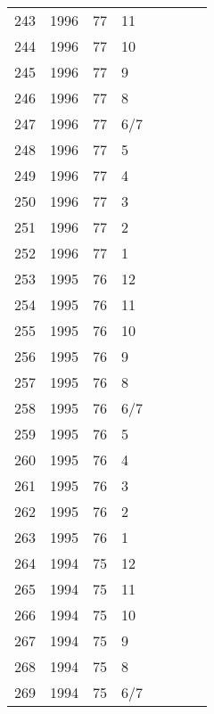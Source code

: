 \begin{longtable}{ |l|l|l|l|l|l|l|l| }
243 & 1996 & 77 &    11 &         &                &  & \\
244 & 1996 & 77 &    10 &         &                &  & \\
245 & 1996 & 77 &     9 &         &                &  & \\
246 & 1996 & 77 &     8 &         &                &  & \\
247 & 1996 & 77 &   6/7 &         &                &  & \\
248 & 1996 & 77 &     5 &         &                &  & \\
249 & 1996 & 77 &     4 &         &                &  & \\
250 & 1996 & 77 &     3 &         &                &  & \\
251 & 1996 & 77 &     2 &         &                &  & \\
252 & 1996 & 77 &     1 &         &                &  & \\
253 & 1995 & 76 &    12 &         &                &  & \\
254 & 1995 & 76 &    11 &         &                &  & \\
255 & 1995 & 76 &    10 &         &                &  & \\
256 & 1995 & 76 &     9 &         &                &  & \\
257 & 1995 & 76 &     8 &         &                &  & \\
258 & 1995 & 76 &   6/7 &         &                &  & \\
259 & 1995 & 76 &     5 &         &                &  & \\
260 & 1995 & 76 &     4 &         &                &  & \\
261 & 1995 & 76 &     3 &         &                &  & \\
262 & 1995 & 76 &     2 &         &                &  & \\
263 & 1995 & 76 &     1 &         &                &  & \\
264 & 1994 & 75 &    12 &         &                &  & \\
265 & 1994 & 75 &    11 &         &                &  & \\
266 & 1994 & 75 &    10 &         &                &  & \\
267 & 1994 & 75 &     9 &         &                &  & \\
268 & 1994 & 75 &     8 &         &                &  & \\
269 & 1994 & 75 &   6/7 &         &                &  & \\

\end{longtable}

